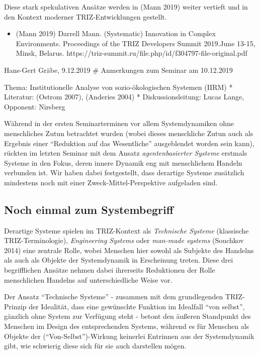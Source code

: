 \documentclass[11pt,a4paper]{article}
\begin{document}
Diese stark spekulativen Ansätze werden in (Mann 2019) weiter vertieft
und in den Kontext moderner TRIZ-Entwicklungen gestellt.

\begin{itemize}
[noitemsep]
\item
  (Mann 2019) Darrell Mann. (Systematic) Innovation in Complex
  Environments. Proceedings of the TRIZ Developers Summit 2019.June
  13-15, Minsk, Belarus.
  https://triz-summit.ru/file.php/id/f304797-file-original.pdf
\end{itemize}

Hans-Gert Gräbe, 9.12.2019 \# Anmerkungen zum Seminar am 10.12.2019

Thema: Institutionelle Analyse von sozio-ökologischen Systemen (IIRM) *
Literatur: (Ostrom 2007), (Anderies 2004) * Diskussionsleitung: Lucas
Lange, Opponent: Nirsberg

Während in der ersten Seminarterminen vor allem Systemdynamiken ohne
menschliches Zutun betrachtet wurden (wobei dieses menschliche Zutun
auch als Ergebnis einer ``Reduktion auf das Wesentliche'' ausgeblendet
worden sein kann), rückten im letzten Seminar mit dem Ansatz
\emph{agentenbasierter Systeme} erstmals Systeme in den Fokus, deren
innere Dynamik eng mit menschlichem Handeln verbunden ist. Wir haben
dabei festgestellt, dass derartige Systeme zusätzlich mindestens noch
mit einer Zweck-Mittel-Perspektive aufgeladen sind.

\hypertarget{noch-einmal-zum-systembegriff}{%
\subsection{Noch einmal zum
Systembegriff}\label{noch-einmal-zum-systembegriff}}

Derartige Systeme spielen im TRIZ-Kontext als \emph{Technische Systeme}
(klassische TRIZ-Terminologie), \emph{Engineering Systems} oder
\emph{man-made systems} (Souchkov 2014) eine zentrale Rolle, wobei
Menschen hier sowohl als Subjekte des Handelns als auch als Objekte der
Systemdynamik in Erscheinung treten. Diese drei begrifflichen Ansätze
nehmen dabei ihrerseits Reduktionen der Rolle menschlichen Handelns auf
unterschiedliche Weise vor.

Der Ansatz ``Technische Systeme'' - zusammen mit dem grundlegenden
TRIZ-Prinzip der Idealität, dass eine gewünschte Funktion im Idealfall
``von selbst'', gänzlich ohne System zur Verfügung steht - betont den
äußeren Standpunkt des Menschen im Design des entsprechenden Systems,
während es für Menschen als Objekte der (``Von-Selbst'')-Wirkung
keinerlei Entrinnen aus der Systemdynamik gibt, wie schwierig diese sich
für sie auch darstellen mögen.
\end{document}
